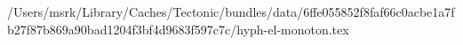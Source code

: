 /Users/msrk/Library/Caches/Tectonic/bundles/data/6ffe055852f8faf66c0acbe1a7fb27f87b869a90bad1204f3bf4d9683f597c7c/hyph-el-monoton.tex